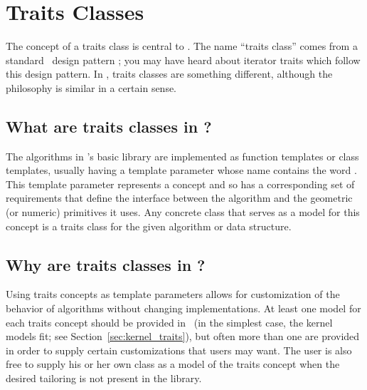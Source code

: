 
\chapter{Traits Classes\label{chap:traits_classes}}

The concept of a traits class is central to \cgal. The name ``traits
class'' comes from a standard \CC\ design pattern
\cite{cgal:m-tnutt-95}; you may have heard about iterator traits which
follow this design pattern. In \cgal, traits classes are something
different, although the philosophy is similar in a certain sense.

\section{What are traits classes in \cgal?\label{sec:what_is_a_traits_class}}

The algorithms in \cgal's basic library are implemented as function templates
or class templates, usually having a template parameter whose name contains
the word .  This template parameter 
represents a concept and so has a corresponding set of requirements that
define the interface between the algorithm and the geometric (or numeric) 
primitives it uses.  Any concrete class that serves as a model for this 
concept is a traits class for the given algorithm or data structure.

\section{Why are traits classes in \cgal?\label{sec:why_traits_classes}}

Using traits concepts as template parameters allows for customization
of the behavior of algorithms without changing implementations.  At
least one model for each traits concept should be provided in \cgal\ 
(in the simplest case, the kernel models fit; see
Section~\ref{sec:kernel_traits}), but often more than one are provided
in order to supply certain customizations that users may want.  The
user is also free to supply his or her own class as a model of the
traits concept when the desired tailoring is not present in the
library.

